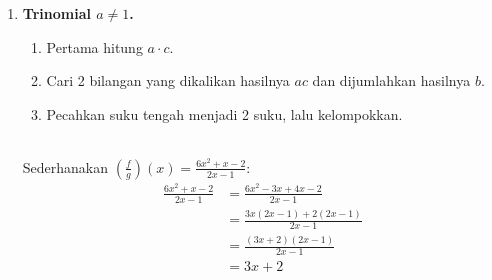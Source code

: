 \begin{enumerate}
\item \textbf{Trinomial $a \ne 1$.}
  \begin{enumerate}
  \item Pertama hitung $a \cdot c$.
  \item Cari 2 bilangan yang dikalikan hasilnya $ac$ dan dijumlahkan hasilnya $b$.
  \item Pecahkan suku tengah menjadi 2 suku, lalu kelompokkan.
  \end{enumerate}
  \begin{example}[Trinomial $a \ne 1$]
    \hfill \\
    Sederhanakan $\left(\frac{f}{g}\right)(x) = \frac{6x^2 + x - 2}{2x - 1}$:
    \[
    \begin{aligned}
      \frac{6x^2 + x - 2}{2x - 1} &= \frac{6x^2 - 3x + 4x - 2}{2x - 1} \\
      &= \frac{3x(2x - 1) + 2(2x - 1)}{2x - 1} \\
      &= \frac{(3x + 2)(2x - 1)}{2x - 1} \\
      &= 3x + 2
    \end{aligned}
    \]
  \end{example}
\end{enumerate}
